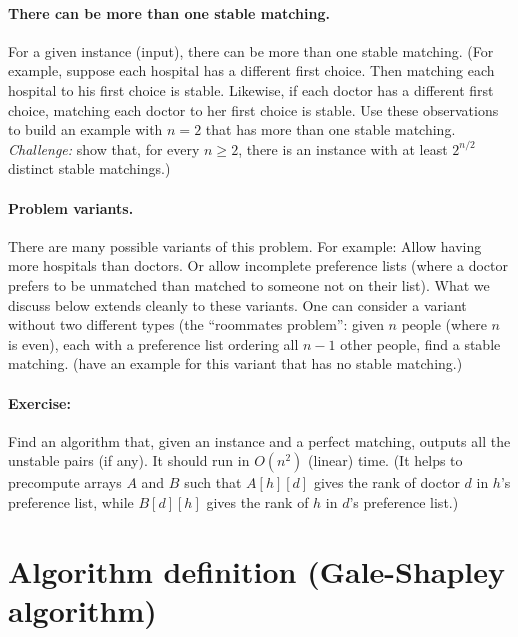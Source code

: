 \documentclass[11pt]{article}
\begin{document}
\paragraph{There can be more than one stable matching.}  
For a given instance (input), there can be more than one stable matching.
(For example, suppose each hospital has a different first choice.
Then matching each hospital to his first choice is stable.
Likewise, if each doctor has a different first choice, matching each doctor to her first choice is stable.
Use these observations to build an example with $n=2$ that has more than one stable matching.
\emph{Challenge:} show that, for every $n \ge 2$, there is an instance with at least $2^{n/2}$ distinct stable matchings.)

\paragraph{Problem variants.}  
There are many possible variants of this problem.  For example: Allow having more hospitals than doctors.  Or allow incomplete preference lists (where a doctor prefers to be unmatched than matched to someone not on their list).  What we discuss below extends cleanly to these variants.  One can consider a variant without two different types (the ``roommates problem'': given $n$ people (where $n$ is even), each with a preference list ordering all $n-1$ other people, find a stable matching.  (\KWSlides have an example for this variant that has no stable matching.)

\paragraph{Exercise:}
Find an algorithm that, given an instance and a perfect matching, outputs all the unstable pairs (if any).
It should run in $O(n^2)$ (linear) time.  (It helps to precompute arrays $A$ and $B$ such that $A[h][d]$ gives the rank of doctor $d$ in $h$'s preference list, while $B[d][h]$ gives the rank of $h$ in $d$'s preference list.)

\newpage

\section{Algorithm definition (Gale-Shapley algorithm)}
\end{document}
